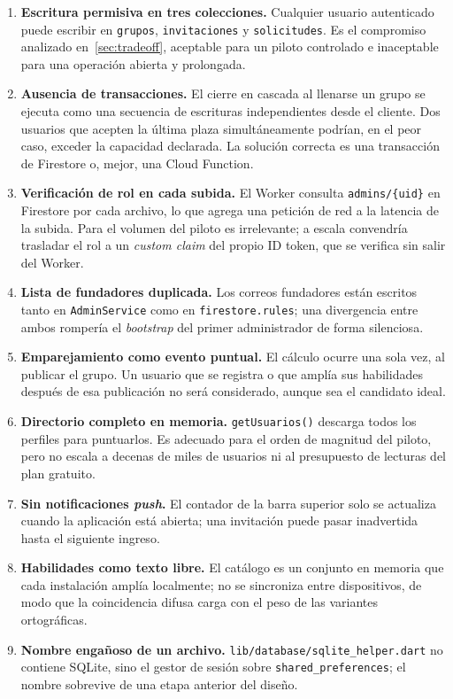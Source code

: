 \documentclass[12pt,a4paper]{article}
\begin{document}
\begin{enumerate}
    \item \textbf{Escritura permisiva en tres colecciones.} Cualquier usuario autenticado puede escribir en \texttt{grupos}, \texttt{invitaciones} y \texttt{solicitudes}. Es el compromiso analizado en~\ref{sec:tradeoff}, aceptable para un piloto controlado e inaceptable para una operación abierta y prolongada.

    \item \textbf{Ausencia de transacciones.} El cierre en cascada al llenarse un grupo se ejecuta como una secuencia de escrituras independientes desde el cliente. Dos usuarios que acepten la última plaza simultáneamente podrían, en el peor caso, exceder la capacidad declarada. La solución correcta es una transacción de Firestore o, mejor, una Cloud Function.

    \item \textbf{Verificación de rol en cada subida.} El Worker consulta \texttt{admins/\{uid\}} en Firestore por cada archivo, lo que agrega una petición de red a la latencia de la subida. Para el volumen del piloto es irrelevante; a escala convendría trasladar el rol a un \emph{custom claim} del propio ID token, que se verifica sin salir del Worker.

    \item \textbf{Lista de fundadores duplicada.} Los correos fundadores están escritos tanto en \texttt{AdminService} como en \texttt{firestore.rules}; una divergencia entre ambos rompería el \emph{bootstrap} del primer administrador de forma silenciosa.

    \item \textbf{Emparejamiento como evento puntual.} El cálculo ocurre una sola vez, al publicar el grupo. Un usuario que se registra o que amplía sus habilidades después de esa publicación no será considerado, aunque sea el candidato ideal.

    \item \textbf{Directorio completo en memoria.} \texttt{getUsuarios()} descarga todos los perfiles para puntuarlos. Es adecuado para el orden de magnitud del piloto, pero no escala a decenas de miles de usuarios ni al presupuesto de lecturas del plan gratuito.

    \item \textbf{Sin notificaciones \emph{push}.} El contador de la barra superior solo se actualiza cuando la aplicación está abierta; una invitación puede pasar inadvertida hasta el siguiente ingreso.

    \item \textbf{Habilidades como texto libre.} El catálogo es un conjunto en memoria que cada instalación amplía localmente; no se sincroniza entre dispositivos, de modo que la coincidencia difusa carga con el peso de las variantes ortográficas.

    \item \textbf{Nombre engañoso de un archivo.} \texttt{lib/database/sqlite\_helper.dart} no contiene SQLite, sino el gestor de sesión sobre \texttt{shared\_preferences}; el nombre sobrevive de una etapa anterior del diseño.
\end{enumerate}
\end{document}
